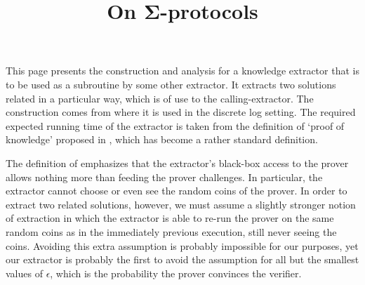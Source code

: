 
\begin{define}
    \newcommand\Sample{\mathtt{Sample}}
    \newcommand\Check{\mathtt{Check}}
    \newcommand\Chall{\mathtt{Chall}}
    \newcommand\Resp{\mathtt{Resp}}
    \newcommand\chall{\mathtt{chall}}
    \newcommand\resp{\mathtt{resp}}
\end{define}

This page presents the construction and analysis for a knowledge extractor that is to be used as a subroutine by some other extractor.
It extracts two solutions related in a particular way, which is of use to the calling-extractor.
The construction comes from \cite{Dam10} where it is used in the discrete log setting.
The required expected running time of the extractor is taken from the definition of `proof of knowledge' proposed in \cite{BG92}, which has become a rather standard definition.

The definition of \cite{BG92} emphasizes that the extractor's black-box access to the prover allows nothing more than feeding the prover challenges.
In particular, the extractor cannot choose or even see the random coins of the prover.
In order to extract two related solutions, however, we must assume a slightly stronger notion of extraction in which the extractor is able to re-run the prover on the same random coins as in the immediately previous execution, still never seeing the coins.
Avoiding this extra assumption is probably impossible for our purposes, yet our extractor is probably the first to avoid the assumption for all but the smallest values of $\epsilon$, which is the probability the prover convinces the verifier.


\begin{references}
    \title{On Σ-protocols}
    \where{}
    \other
\end{references}

